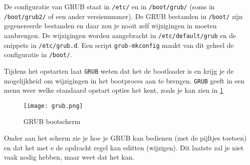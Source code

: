 De configuratie van GRUB staat in \texttt{/etc/} en in \texttt{/boot/grub/} (soms in \texttt{/boot/grub2/} of een ander versienummer). De GRUB bestanden in \texttt{/boot/} zijn gegenereerde bestanden en daar zou je nooit zelf wijzigingen in moeten aanbrengen. De wijzigingen worden aangebracht in \texttt{/etc/default/grub} en de snippets in \texttt{/etc/grub.d}. Een script \texttt{grub-mkconfig} maakt van dit geheel de configuratie in \texttt{/boot/}.

Tijdens het opstarten laat \texttt{GRUB} weten dat het de bootloader is en krijg je de mogelijkheid om wijzigingen in het bootproces aan te brengen. \texttt{GRUB} geeft in een menu weer welke standaard opstart opties het kent, zoals je kan zien in \ref{fig:grub}

\begin{figure}[H]
\texttt{[image: grub.png]}
	\caption{GRUB bootscherm}
	\label{fig:grub}
\end{figure}

Onder aan het scherm zie je hoe je GRUB kan bedienen (met de pijltjes toetsen) en dat het met e de opdracht regel kan editten (wijzigen). Dit laatste zal je niet vaak nodig hebben, maar weet dat het kan.

